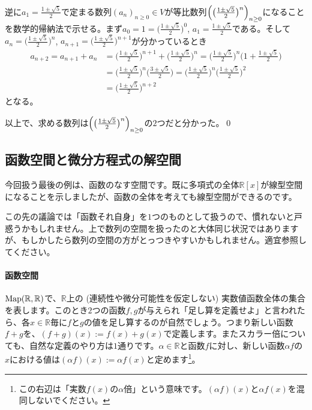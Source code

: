 逆に$a_1 = \frac{1 \pm \sqrt{5}}{2}$で定まる数列$(a_n)_{n \geq 0} \in V$が等比数列$\Bigl(\bigl(\frac{1 \pm \sqrt{5}}{2}\bigr)^n\Bigr)_{n \geq 0}$になることを数学的帰納法で示せる。まず$a_0 = 1 = \bigl(\frac{1 \pm \sqrt{5}}{2}\bigr)^0$, $a_1 = \frac{1 \pm \sqrt{5}}{2}$である。そして$a_n = \bigl( \frac{1 \pm \sqrt{5}}{2} \bigr)^n$, $a_{n + 1} = \bigl(\frac{1 \pm \sqrt{5}}{2}\bigr)^{n+1}$が分かっているとき
\begin{align*}
a_{n + 2} = a_{n + 1} + a_n 
&= \biggl(\frac{1 \pm \sqrt{5}}{2}\biggr)^{n + 1} + \biggl(\frac{1 \pm \sqrt{5}}{2}\biggr)^n
= \biggl(\frac{1 \pm \sqrt{5}}{2}\biggr)^n\biggl(1 + \frac{1 \pm \sqrt{5}}{2}\biggr) \\
&= \biggl(\frac{1 \pm \sqrt{5}}{2}\biggr)^n \biggl(\frac{3 \pm \sqrt{5}}{2}\biggr)
= \biggl(\frac{1 \pm \sqrt{5}}{2}\biggr)^n \biggl(\frac{1 \pm \sqrt{5}}{2}\biggr)^2 \\
&= \biggl(\frac{1 \pm \sqrt{5}}{2}\biggr)^{n+2}
\end{align*}
となる。

以上で、求める数列は$\Bigl(\bigl(\frac{1 \pm \sqrt{5}}{2}\bigr)^n\Bigr)_{n \geq 0}$の$2$つだと分かった。\qed

\subsection{函数空間と微分方程式の解空間}

今回扱う最後の例は、函数のなす空間です。既に多項式の全体$\mathbb{R}[x]$が線型空間になることを示しましたが、函数の全体を考えても線型空間ができるのです。

この先の議論では「函数それ自身」を$1$つのものとして扱うので、慣れないと戸惑うかもしれません。上で数列の空間を扱ったのと大体同じ状況ではありますが、もしかしたら数列の空間の方がとっつきやすいかもしれません。適宜参照してください。

\paragraph{函数空間} \label{paragraph:funct_space}

$\operatorname{Map}(\mathbb{R}, \mathbb{R})$で、$\mathbb{R}$上の (連続性や微分可能性を仮定しない) 実数値函数全体の集合を表します。このとき$2$つの函数$f, g$が与えられ「足し算を定義せよ」と言われたら、各$x \in \mathbb{R}$毎に$f$と$g$の値を足し算するのが自然でしょう。つまり新しい函数$f + g$を、$(f + g)(x) := f(x) + g(x)$で定義します。またスカラー倍についても、自然な定義のやり方は$1$通りです。$\alpha\in\mathbb{R}$と函数$f$に対し、新しい函数$\alpha f$の$x$における値は$(\alpha f)(x) := \alpha f(x)$と定めます\footnote{この右辺は「実数$f(x)$の$\alpha$倍」という意味です。$(\alpha f)(x)$と$\alpha f(x)$を混同しないでください。}。

